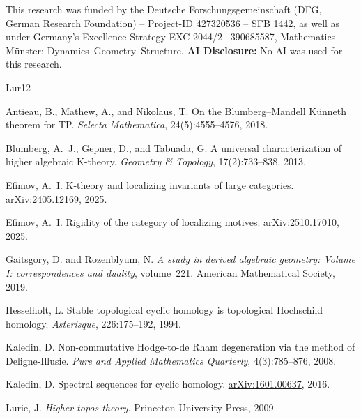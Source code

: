 \documentclass{article}
\theoremstyle{definition}
\begin{document}
This research was funded by the Deutsche Forschungsgemeinschaft (DFG, German Research Foundation) – Project-ID 427320536 – SFB 1442, as well as under Germany's Excellence Strategy EXC 2044/2 –390685587, Mathematics Münster: Dynamics–Geometry–Structure.
\newline 
\textbf{AI Disclosure: } No AI was used for this research.

%

%


\begin{thebibliography}{Lur12}

Antieau, B., Mathew, A., and Nikolaus, T.
\newblock On the Blumberg--Mandell K\"unneth theorem for {TP}.
\newblock \emph{Selecta Mathematica}, 24(5):4555--4576, 2018.

Blumberg, A.~J., Gepner, D., and Tabuada, G.
\newblock A universal characterization of higher algebraic {K}-theory.
\newblock \emph{Geometry \& Topology}, 17(2):733--838, 2013.

Efimov, A.~I.
\newblock K-theory and localizing invariants of large categories.
\newblock \href{https://arxiv.org/abs/2405.12169}{arXiv:2405.12169}, 2025.


Efimov, A.~I.
\newblock Rigidity of the category of localizing motives.
\newblock \href{https://arxiv.org/abs/2510.17010}{arXiv:2510.17010}, 2025.

Gaitsgory, D. and Rozenblyum, N.
\newblock \emph{A study in derived algebraic geometry: Volume {I}: correspondences and duality}, volume~221.
\newblock American Mathematical Society, 2019.

Hesselholt, L.
\newblock Stable topological cyclic homology is topological {Hochschild} homology.
\newblock \emph{Asterisque}, 226:175--192, 1994.

Kaledin, D.
\newblock Non-commutative {Hodge-to-de Rham} degeneration via the method of {Deligne-Illusie}.
\newblock \emph{Pure and Applied Mathematics Quarterly}, 4(3):785--876, 2008.

Kaledin, D.
\newblock Spectral sequences for cyclic homology.
\newblock \href{https://arxiv.org/abs/1601.00637}{arXiv:1601.00637}, 2016.

Lurie, J.
\newblock \emph{Higher topos theory}.
\newblock Princeton University Press, 2009.


\end{thebibliography}
\end{document}
